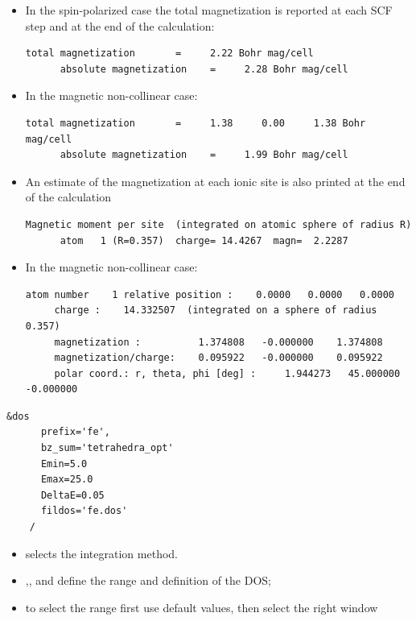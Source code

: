 \documentclass[landscape]{foils}
\begin{document}
\begin{itemize}
  \item In the spin-polarized case the total magnetization is reported at each SCF step
    and at the end of the calculation: 
    \begin{Verbatim}[frame=single,fontsize=\small]
      total magnetization       =     2.22 Bohr mag/cell
      absolute magnetization    =     2.28 Bohr mag/cell
    \end{Verbatim}
  \item In the magnetic non-collinear case:
    \begin{Verbatim}[frame=single,fontsize=\small]
      total magnetization       =     1.38     0.00     1.38 Bohr mag/cell
      absolute magnetization    =     1.99 Bohr mag/cell
    \end{Verbatim}
  \item An estimate of the magnetization at each ionic site is also printed at the end of the calculation
    \begin{Verbatim}[frame=single, fontsize=\small]
      Magnetic moment per site  (integrated on atomic sphere of radius R)
      atom   1 (R=0.357)  charge= 14.4267  magn=  2.2287
    \end{Verbatim}
  \item In the magnetic non-collinear case:
    \begin{Verbatim}[frame=single, fontsize=\small]
     atom number    1 relative position :    0.0000   0.0000   0.0000
     charge :    14.332507  (integrated on a sphere of radius 0.357)
     magnetization :          1.374808   -0.000000    1.374808
     magnetization/charge:    0.095922   -0.000000    0.095922
     polar coord.: r, theta, phi [deg] :     1.944273   45.000000   -0.000000
    \end{Verbatim}
\end{itemize}
\begin{minipage}{14cm}
  \begin{Verbatim}[frame=single, commandchars=\\\{\},fontsize=\small]
    &dos
      prefix='fe',
      bz_sum='tetrahedra_opt'
      Emin=5.0
      Emax=25.0 
      DeltaE=0.05
      fildos='fe.dos'
    /
  \end{Verbatim}
\end{minipage}
\hfill
\parbox{12cm}{
  \begin{itemize}
    \small
    \item {} selects the integration method. 
    \item {},, and  define the range and definition of the DOS;
    \item to select the range first use default values, then select the right window
  \end{itemize}
}
\end{document}
